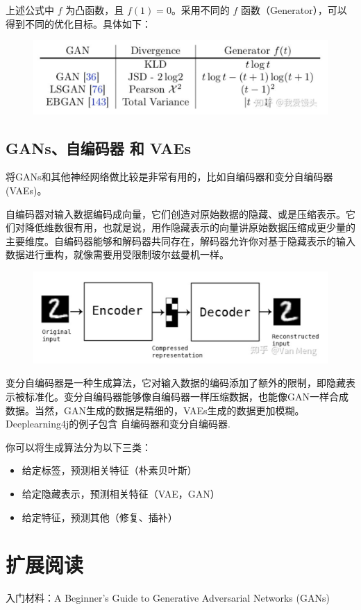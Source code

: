 \documentclass[12pt]{article}
\begin{document}
上述公式中 $f$ 为凸函数，且 $f(1) = 0$。采用不同的 $f$ 函数（Generator），可以得到不同的优化目标。具体如下：
\begin{figure}[H]
    \centering
    \includegraphics[width=.8\textwidth]{fig/GAN_Diff_F_Divergence.png}
\end{figure}


\subsection{GANs、自编码器 和 VAEs}
将GANs和其他神经网络做比较是非常有用的，比如自编码器和变分自编码器(VAEs)。

自编码器对输入数据编码成向量，它们创造对原始数据的隐藏、或是压缩表示。它们对降低维数很有用，也就是说，用作隐藏表示的向量讲原始数据压缩成更少量的主要维度。自编码器能够和解码器共同存在，解码器允许你对基于隐藏表示的输入数据进行重构，就像需要用受限制玻尔兹曼机一样。
\begin{figure}[H]
    \centering
    \includegraphics[width=1\textwidth]{fig/GAN_AutoEncoder.png}
\end{figure}

变分自编码器是一种生成算法，它对输入数据的编码添加了额外的限制，即隐藏表示被标准化。变分自编码器能够像自编码器一样压缩数据，也能像GAN一样合成数据。当然，GAN生成的数据是精细的，VAEs生成的数据更加模糊。Deeplearning4j的例子包含 自编码器和变分自编码器.

你可以将生成算法分为以下三类：
\begin{itemize}
\setlength{\itemsep}{0pt}
\setlength{\parsep}{0pt}
\setlength{\parskip}{0pt}
    \item 给定标签，预测相关特征（朴素贝叶斯）
    \item 给定隐藏表示，预测相关特征（VAE，GAN）
    \item 给定特征，预测其他（修复、插补）
\end{itemize}

\section{扩展阅读}
入门材料：A Beginner's Guide to Generative Adversarial Networks (GANs)




\end{document}
